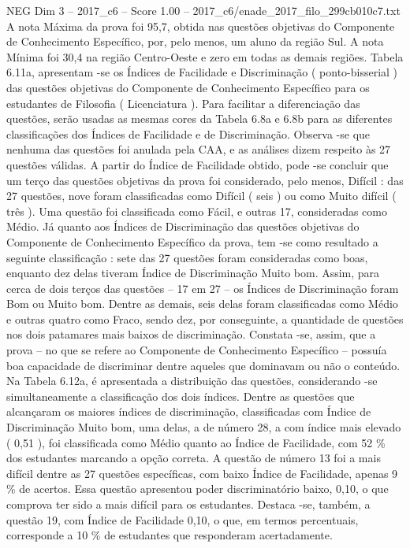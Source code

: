 \begin{textsample}{NEG Dim 3 – 2017\_c6 – Score 1.00 – 2017\_c6/enade\_2017\_filo\_299cb010c7.txt}
A nota Máxima da prova foi 95,7, obtida nas questões objetivas do Componente de Conhecimento Específico, por, pelo menos, um aluno da região Sul.
A nota Mínima foi 30,4 na região Centro-Oeste e zero em todas as demais regiões.
Tabela 6.11a, apresentam -se os Índices de Facilidade e Discriminação ( ponto-bisserial ) das questões objetivas do Componente de Conhecimento Específico para os estudantes de Filosofia ( Licenciatura ).
Para facilitar a diferenciação das questões, serão usadas as mesmas cores da Tabela 6.8a e 6.8b para as diferentes classificações dos Índices de Facilidade e de Discriminação.
Observa -se que nenhuma das questões foi anulada pela CAA, e as análises dizem respeito às 27 questões válidas.
A partir do Índice de Facilidade obtido, pode -se concluir que um terço das questões objetivas da prova foi considerado, pelo menos, Difícil : das 27 questões, nove foram classificadas como Difícil ( seis ) ou como Muito difícil ( três ).
Uma questão foi classificada como Fácil, e outras 17, consideradas como Médio.
Já quanto aos Índices de Discriminação das questões objetivas do Componente de Conhecimento Específico da prova, tem -se como resultado a seguinte classificação : sete das 27 questões foram consideradas como boas, enquanto dez delas tiveram Índice de Discriminação Muito bom.
Assim, para cerca de dois terços das questões – 17 em 27 – os Índices de Discriminação foram Bom ou Muito bom.
Dentre as demais, seis delas foram classificadas como Médio e outras quatro como Fraco, sendo dez, por conseguinte, a quantidade de questões nos dois patamares mais baixos de discriminação.
Constata -se, assim, que a prova – no que se refere ao Componente de Conhecimento Específico – possuía boa capacidade de discriminar dentre aqueles que dominavam ou não o conteúdo.
Na Tabela 6.12a, é apresentada a distribuição das questões, considerando -se simultaneamente a classificação dos dois índices.
Dentre as questões que alcançaram os maiores índices de discriminação, classificadas com Índice de Discriminação Muito bom, uma delas, a de número 28, a com índice mais elevado ( 0,51 ), foi classificada como Médio quanto ao Índice de Facilidade, com 52 \% dos estudantes marcando a opção correta.
A questão de número 13 foi a mais difícil dentre as 27 questões específicas, com baixo Índice de Facilidade, apenas 9 \% de acertos.
Essa questão apresentou poder discriminatório baixo, 0,10, o que comprova ter sido a mais difícil para os estudantes.
Destaca -se, também, a questão 19, com Índice de Facilidade 0,10, o que, em termos percentuais, corresponde a 10 \% de estudantes que responderam acertadamente.

\end{textsample}

